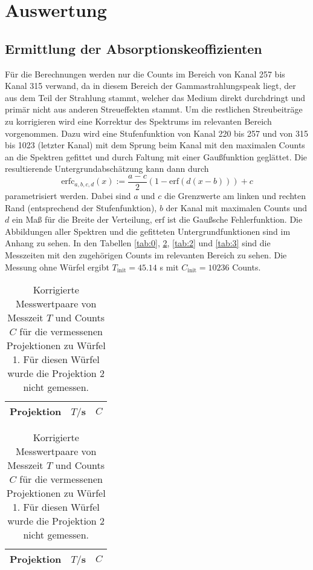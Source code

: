

\section{Auswertung}
\subsection{Ermittlung der Absorptionskeoffizienten}
Für die Berechnungen werden nur die Counts im Bereich von Kanal 257 bis Kanal 315 verwand, da in 
diesem Bereich der Gammastrahlungspeak liegt, der aus dem Teil der Strahlung stammt, welcher 
das Medium direkt durchdringt und primär nicht aus anderen Streueffekten stammt. Um die 
restlichen 
Streubeiträge zu korrigieren wird eine Korrektur des Spektrums im relevanten Bereich vorgenommen. 
Dazu wird eine Stufenfunktion von Kanal 220 bis 257 und von 315 bis 1023 (letzter Kanal) mit dem 
Sprung beim Kanal mit den maximalen Counts an die Spektren gefittet und durch Faltung mit einer 
Gaußfunktion geglättet. Die resultierende Untergrundabschätzung kann dann durch
\begin{equation}
\text{erfc}_{a,b,c,d}(x):=\frac{a-c}{2} \left(1-\text{erf}(d(x-b))\right)+c
\end{equation}
parametrisiert werden. Dabei sind $a$ und $c$ die Grenzwerte am linken und rechten Rand 
(entsprechend der Stufenfunktion), $b$ der Kanal mit maximalen Counts und $d$ ein Maß für die 
Breite der Verteilung, $\text{erf}$ ist die Gaußsche Fehlerfunktion. Die Abbildungen aller 
Spektren und die gefitteten Untergrundfunktionen sind im Anhang zu sehen. In den Tabellen 
\ref{tab:0}, \ref{tab:1}, \ref{tab:2} und \ref{tab:3} sind die Messzeiten mit den zugehörigen 
Counts im relevanten Bereich zu sehen. Die Messung ohne Würfel ergibt $T_\text{init}=45.14$ s mit 
$C_\text{init}=10236$ Counts.
\begin{table}
\centering
\begin{tabular}{ccc}
\toprule \midrule
Projektion &$T/$s & $C$ \\
\midrule

\midrule
\bottomrule
\end{tabular}
\caption{Korrigierte Messwertpaare von Messzeit $T$ und Counts $C$ für die vermessenen 
Projektionen zu 
Würfel 0.} \label{tab:0}

\begin{tabular}{ccc}
\toprule \midrule
Projektion &$T/$s & $C$ \\
\midrule

\midrule
\bottomrule
\end{tabular}
\caption{Korrigierte Messwertpaare von Messzeit $T$ und Counts $C$ für die vermessenen 
Projektionen zu 
Würfel 1. Für diesen Würfel wurde die Projektion 2 nicht gemessen.} \label{tab:1}
\end{table}

